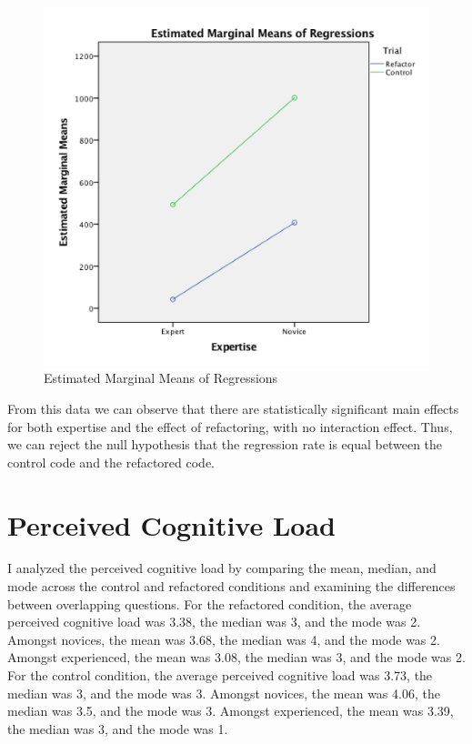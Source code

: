 \begin{figure}[H]
	\centering
	\includegraphics[scale=.5]{estimatedMarginalMeansOfRegression}
	\caption{Estimated Marginal Means of Regressions}
\end{figure}

From this data we can observe that there are statistically significant main effects for both expertise and the effect of refactoring, with no interaction effect. Thus, we can reject the null hypothesis that the regression rate is equal between the control code and the refactored code.
\section{Perceived Cognitive Load}
I analyzed the perceived cognitive load by comparing the mean, median, and mode across the control and refactored conditions and examining the differences between overlapping questions. For the refactored condition, the average perceived cognitive load was 3.38, the median was 3, and the mode was 2. Amongst novices, the mean was 3.68, the median was 4, and the mode was 2. Amongst experienced, the mean was 3.08, the median was 3, and the mode was 2. For the control condition, the average perceived cognitive load was 3.73, the median was 3, and the mode was 3. Amongst novices, the mean was 4.06, the median was 3.5, and the mode was 3. Amongst experienced, the mean was 3.39, the median was 3, and the mode was 1.

